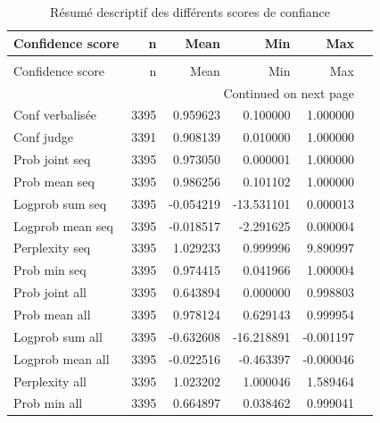 \begin{longtable}{p{4.0cm}rrrrl}
\caption{Résumé descriptif des différents scores de confiance} \label{tab:confidence_dispersion} \\
\toprule
Confidence score & n & Mean & Min & Max \\
\midrule
\endfirsthead
\caption[]{Résumé descriptif des différents scores de confiance} \\
\toprule
Confidence score & n & Mean & Min & Max \\
\midrule
\endhead
\midrule
\multicolumn{5}{r}{Continued on next page} \\
\midrule
\endfoot
\bottomrule
\endlastfoot
Conf verbalisée & 3395 & 0.959623 & 0.100000 & 1.000000 \\
Conf judge & 3391 & 0.908139 & 0.010000 & 1.000000 \\
Prob joint seq & 3395 & 0.973050 & 0.000001 & 1.000000 \\
Prob mean seq & 3395 & 0.986256 & 0.101102 & 1.000000 \\
Logprob sum seq & 3395 & -0.054219 & -13.531101 & 0.000013 \\
Logprob mean seq & 3395 & -0.018517 & -2.291625 & 0.000004 \\
Perplexity seq & 3395 & 1.029233 & 0.999996 & 9.890997 \\
Prob min seq & 3395 & 0.974415 & 0.041966 & 1.000004 \\
Prob joint all & 3395 & 0.643894 & 0.000000 & 0.998803 \\
Prob mean all & 3395 & 0.978124 & 0.629143 & 0.999954 \\
Logprob sum all & 3395 & -0.632608 & -16.218891 & -0.001197 \\
Logprob mean all & 3395 & -0.022516 & -0.463397 & -0.000046 \\
Perplexity all & 3395 & 1.023202 & 1.000046 & 1.589464 \\
Prob min all & 3395 & 0.664897 & 0.038462 & 0.999041 \\
\end{longtable}
